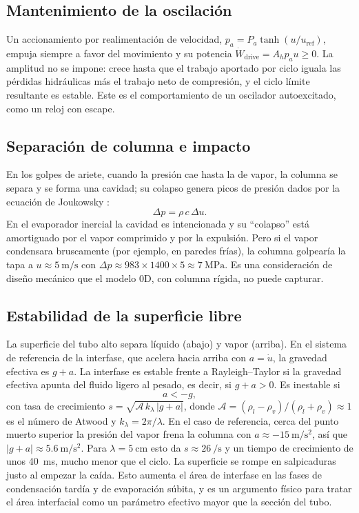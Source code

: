 \documentclass[11pt,a4paper]{article}
\newcommand{\Wdot}{\dot W}
\begin{document}
\subsection{Mantenimiento de la oscilación}

Un accionamiento por realimentación de velocidad, $p_a = P_a \tanh(u/u_{\mathrm{ref}})$, empuja siempre a favor del movimiento y su potencia $\Wdot_{\mathrm{drive}} = A_h p_a u \ge 0$. La amplitud no se impone: crece hasta que el trabajo aportado por ciclo iguala las pérdidas hidráulicas más el trabajo neto de compresión, y el ciclo límite resultante es estable. Este es el comportamiento de un oscilador autoexcitado, como un reloj con escape.

\subsection{Separación de columna e impacto}\label{sec:joukowsky}

En los golpes de ariete, cuando la presión cae hasta la de vapor, la columna se separa y se forma una cavidad; su colapso genera picos de presión dados por la ecuación de Joukowsky \cite{wylie,bergant}:
\begin{equation}
\Delta p = \rho\,c\,\Delta u .
\end{equation}
En el evaporador inercial la cavidad es intencionada y su ``colapso'' está amortiguado por el vapor comprimido y por la expulsión. Pero si el vapor condensara bruscamente (por ejemplo, en paredes frías), la columna golpearía la tapa a $u\approx\SI{5}{\metre\per\second}$ con $\Delta p\approx 983\times1400\times5\approx\SI{7}{\mega\pascal}$. Es una consideración de diseño mecánico que el modelo 0D, con columna rígida, no puede capturar.

\subsection{Estabilidad de la superficie libre}

La superficie del tubo alto separa líquido (abajo) y vapor (arriba). En el sistema de referencia de la interfase, que acelera hacia arriba con $a=\dot u$, la gravedad efectiva es $g+a$. La interfase es estable frente a Rayleigh--Taylor si la gravedad efectiva apunta del fluido ligero al pesado, es decir, si $g + a > 0$. Es inestable si
\begin{equation}
a < -g ,
\end{equation}
con tasa de crecimiento $s = \sqrt{\mathcal{A}\,k_\lambda\,|g+a|}$, donde $\mathcal{A}=(\rho_l-\rho_v)/(\rho_l+\rho_v)\approx 1$ es el número de Atwood y $k_\lambda = 2\pi/\lambda$. En el caso de referencia, cerca del punto muerto superior la presión del vapor frena la columna con $a\approx\SI{-15}{\metre\per\second\squared}$, así que $|g+a|\approx\SI{5.6}{\metre\per\second\squared}$. Para $\lambda=\SI{5}{\centi\metre}$ esto da $s\approx\SI{26}{\per\second}$ y un tiempo de crecimiento de unos \SI{40}{\milli\second}, mucho menor que el ciclo. La superficie se rompe en salpicaduras justo al empezar la caída. Esto aumenta el área de interfase en las fases de condensación tardía y de evaporación súbita, y es un argumento físico para tratar el área interfacial como un parámetro efectivo mayor que la sección del tubo.
\end{document}
